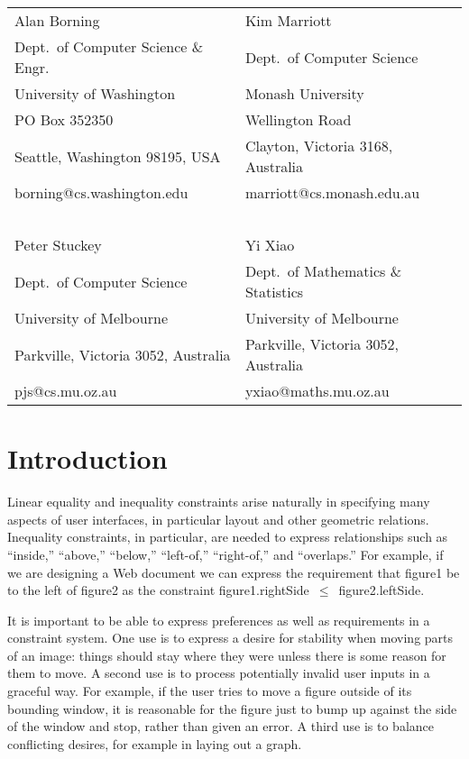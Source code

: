 \documentclass{article}
\newcommand{\code}{\small\sf}
\begin{document}
\begin{center}
\begin{tabular}{ll}
Alan Borning                         & Kim Marriott   \\
Dept.\ of Computer Science \& Engr.  & Dept.\ of Computer Science \\
University of Washington  	     & Monash University \\
PO Box 352350                        & Wellington Road  \\
Seattle, Washington 98195, USA       & Clayton, Victoria 3168, Australia   \\
borning@cs.washington.edu            & marriott@cs.monash.edu.au \\
\ \\
Peter Stuckey                        & Yi Xiao  \\
Dept.\ of Computer Science           & Dept.\ of Mathematics \& Statistics \\
University of Melbourne              & University of Melbourne \\
Parkville, Victoria 3052, Australia  &  Parkville, Victoria 3052, Australia \\
pjs@cs.mu.oz.au                      &  yxiao@maths.mu.oz.au
\end{tabular}
\end{center}

\newpage
\pagestyle{plain}

\section{Introduction}

Linear equality and inequality constraints arise naturally in specifying
many aspects of user interfaces, in particular layout and other geometric
relations.  Inequality constraints, in particular, are needed to express
relationships such as ``inside,'' ``above,'' ``below,'' ``left-of,''
``right-of,'' and ``overlaps.''  For example, if we are designing a
Web document we can express the
requirement that {\code figure1} be to the left of {\code figure2} as the
constraint \mbox{\code figure1.rightSide $\leq$ figure2.leftSide}.

It is important to be able to express preferences as well as requirements
in a constraint system.  One use is to express a desire for stability
when moving parts of an image: things should stay where they were unless
there is some reason for them to move.  A second use is to process
potentially invalid user inputs in a graceful way.  For example, if the
user tries to move a figure outside of its bounding window, it is
reasonable for the figure just to bump up against the side of the window
and stop, rather than given an error.  A
third use is to balance conflicting desires, for example in laying out a
graph.
\end{document}

